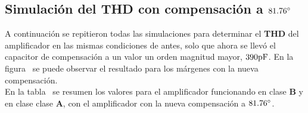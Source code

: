 

\subsection{Simulación del \textbf{THD} con compensación a $81.76 \si[per-mode=symbol]{\degree}$ }


A continuación se repitieron todas las simulaciones para determinar el \textbf{THD} del amplificador en las mismas condiciones de antes, solo que ahora se llevó el capacitor de compensación a un valor un orden magnitud mayor, $390 \si[per-mode=symbol]{\pico\farad}$. En la figura~ se puede observar el resultado para los márgenes con la nueva compensación. \\

En la tabla~ se resumen los valores para el amplificador funcionando en clase \textbf{B} y en clase clase \textbf{A}, con el amplificador con la nueva compensación a $81.76 \si[per-mode=symbol]{\degree}$. \\



 
\begin{table}[H]  %

    \setlength\arrayrulewidth{1.5pt}
    \def\clinecolor{\hhline{|>{\arrayrulecolor{white}}-%
    >{\arrayrulecolor{white}}|-|-|-|}}
	\caption{\footnotesize{THD obtenido a $1 \si[per-mode=symbol]{\kilo\hertz}$ y $10 \si[per-mode=symbol]{\kilo\hertz}$ para modo de operación en clase \textbf{B} y clase \textbf{A}, compensado a $81.76 \si[per-mode=symbol]{\degree}$.}}
	\label{table:table_THD_vs_freq_and_compensation_2}
\end{table}

